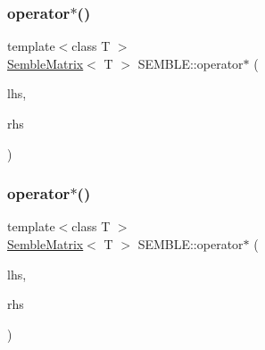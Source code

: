 \mbox{\label{namespaceSEMBLE_a4b0ae33797f704d614ed0a31b9bdf51a}} 
\subsubsection{\texorpdfstring{operator$\ast$()}{operator*()}\hspace{0.1cm}{\footnotesize\ttfamily [18/20]}}
{\footnotesize\ttfamily template$<$class T $>$ \\
\mbox{\hyperlink{structSEMBLE_1_1SembleMatrix}{Semble\+Matrix}}$<$ T $>$ S\+E\+M\+B\+L\+E\+::operator$\ast$ (\begin{DoxyParamCaption}\item[{const \mbox{\hyperlink{structSEMBLE_1_1SembleMatrix}{Semble\+Matrix}}$<$ T $>$ \&}]{lhs,  }\item[{const \mbox{\hyperlink{structSEMBLE_1_1SembleMatrix}{Semble\+Matrix}}$<$ T $>$ \&}]{rhs }\end{DoxyParamCaption})}

\mbox{\label{namespaceSEMBLE_a43dcbbd3809fc622936a5edfd8a682a9}} 
\subsubsection{\texorpdfstring{operator$\ast$()}{operator*()}\hspace{0.1cm}{\footnotesize\ttfamily [19/20]}}
{\footnotesize\ttfamily template$<$class T $>$ \\
\mbox{\hyperlink{structSEMBLE_1_1SembleMatrix}{Semble\+Matrix}}$<$ T $>$ S\+E\+M\+B\+L\+E\+::operator$\ast$ (\begin{DoxyParamCaption}\item[{const \mbox{\hyperlink{structSEMBLE_1_1SembleMatrix}{Semble\+Matrix}}$<$ T $>$ \&}]{lhs,  }\item[{const itpp\+::\+Mat$<$ T $>$ \&}]{rhs }\end{DoxyParamCaption})}

\mbox{\label{namespaceSEMBLE_aa848b76b110517db4feab23c8e83a941}} 
